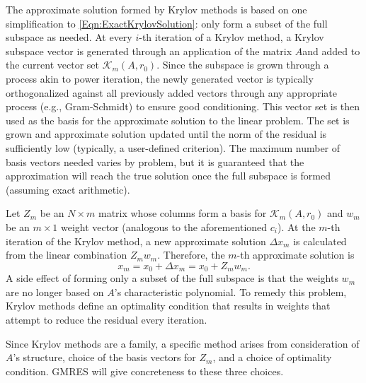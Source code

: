 \documentclass[Prelim,12pt]{WisconsinThesis}
\newcommand{\by}    {\!\times\!}
\begin{document}
The approximate solution formed by Krylov methods is based on one simplification to \cref{Eqn:ExactKrylovSolution}: only form a subset of the full subspace as needed.
At every $i$-th iteration of a Krylov method, a Krylov subspace vector is generated through an application of the matrix $A$and added to the current vector set $\mathcal{K}_m(A,r_0)$.
Since the subspace is grown through a process akin to power iteration, the newly generated vector is typically orthogonalized against all previously added vectors through any appropriate process (e.g., Gram-Schmidt) to ensure good conditioning.
This vector set is then used as the basis for the approximate solution to the linear problem.
The set is grown and approximate solution updated until the norm of the residual is sufficiently low (typically, a user-defined criterion).
The maximum number of basis vectors needed varies by problem, but it is guaranteed that the approximation will reach the true solution once the full subspace is formed (assuming exact arithmetic).


Let $Z_m$ be an $N \by m$ matrix whose columns form a basis for $\mathcal{K}_m(A,r_0)$ and $w_m$ be an $m \by 1$ weight vector (analogous to the aforementioned $c_i$).
At the $m$-th iteration of the Krylov method, a new approximate solution $\Delta{x}_m$ is calculated from the linear combination $Z_m w_m$.
Therefore, the $m$-th approximate solution is
\begin{equation}
    x_m = x_0 + \Delta{x}_m = x_0 + Z_m w_m.
    \label{Eqn:ApproximateKrylovSolution}
\end{equation}
A side effect of forming only a subset of the full subspace is that the weights $w_m$ are no longer based on $A$'s characteristic polynomial.
To remedy this problem, Krylov methods define an optimality condition that results in weights that attempt to reduce the residual every iteration.


Since Krylov methods are a family, a specific method arises from consideration of $A$'s structure, choice of the basis vectors for $Z_m$, and a choice of optimality condition.
GMRES will give concreteness to these three choices.
\end{document}
